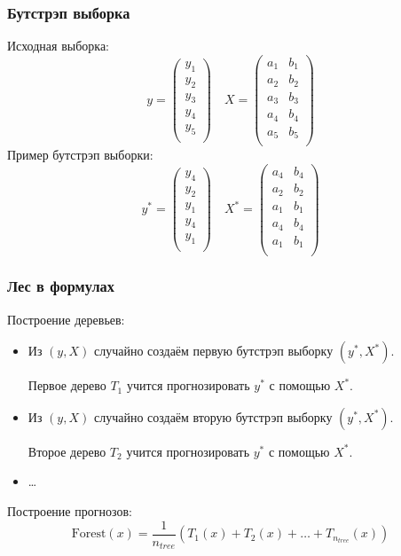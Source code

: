 \begin{frame}
  \frametitle{Бутстрэп выборка}
  \alert{Исходная} выборка:
  \[
  y = \begin{pmatrix}
    y_1 \\
    y_2 \\
    y_3 \\
    y_4 \\
    y_5 \\
  \end{pmatrix}  \quad 
  X = \begin{pmatrix}
    a_1 & b_1 \\
    a_2 & b_2 \\
    a_3 & b_3 \\
    a_4 & b_4 \\
    a_5 & b_5 \\
  \end{pmatrix}
  \]
  \pause
  Пример \alert{бутстрэп} выборки:
  \[
  y^* = \begin{pmatrix}
    y_4 \\
    y_2 \\
    y_1 \\
    y_4 \\
    y_1 \\
  \end{pmatrix}  \quad 
  X^* = \begin{pmatrix}
    a_4 & b_4 \\
    a_2 & b_2 \\
    a_1 & b_1 \\
    a_4 & b_4 \\
    a_1 & b_1 \\
  \end{pmatrix}
  \]

\end{frame}


\begin{frame}
  \frametitle{Лес в формулах}
  Построение \alert{деревьев}:
  \begin{itemize}[<+->]
    \item Из $(y, X)$ случайно создаём первую бутстрэп выборку $(y^*, X^*)$.
    
    Первое дерево $T_1$ учится прогнозировать $y^{*}$ с помощью $X^{*}$.

    \item Из $(y, X)$ случайно создаём вторую бутстрэп выборку $(y^*, X^*)$.
    
    Второе дерево $T_2$ учится прогнозировать $y^{*}$ с помощью $X^{*}$.

    \item \ldots

  \end{itemize}

  \pause
  Построение \alert{прогнозов}:
  \[
  \text{Forest}(x) = \frac{1}{n_{tree}}(T_1(x) + T_2(x) + \ldots + T_{n_{tree}} (x))
  \]
\end{frame}



